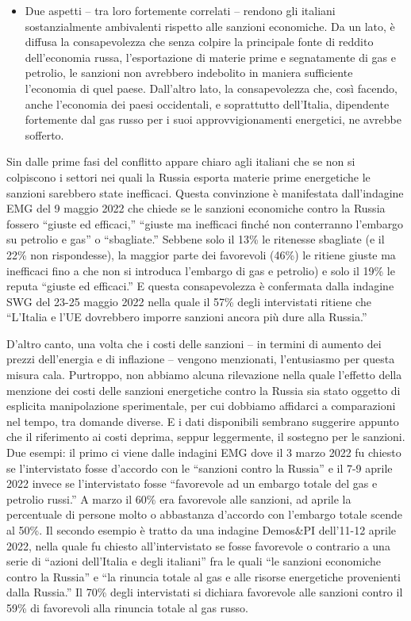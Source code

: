 \documentclass[
  openany]{book}
\providecommand{\tightlist}{%
  \setlength{\itemsep}{0pt}\setlength{\parskip}{0pt}}
\begin{document}
\begin{itemize}
\tightlist
\item
  Due aspetti -- tra loro fortemente correlati -- rendono gli italiani sostanzialmente ambivalenti rispetto alle sanzioni economiche. Da un lato, è diffusa la consapevolezza che senza colpire la principale fonte di reddito dell'economia russa, l'esportazione di materie prime e segnatamente di gas e petrolio, le sanzioni non avrebbero indebolito in maniera sufficiente l'economia di quel paese. Dall'altro lato, la consapevolezza che, così facendo, anche l'economia dei paesi occidentali, e soprattutto dell'Italia, dipendente fortemente dal gas russo per i suoi approvvigionamenti energetici, ne avrebbe sofferto.
\end{itemize}

Sin dalle prime fasi del conflitto appare chiaro agli italiani che se non si colpiscono i settori nei quali la Russia esporta materie prime energetiche le sanzioni sarebbero state inefficaci. Questa convinzione è manifestata dall'indagine EMG del 9 maggio 2022 che chiede se le sanzioni economiche contro la Russia fossero ``giuste ed efficaci,'' ``giuste ma inefficaci finché non conterranno l'embargo su petrolio e gas'' o ``sbagliate.'' Sebbene solo il 13\% le ritenesse sbagliate (e il 22\% non rispondesse), la maggior parte dei favorevoli (46\%) le ritiene giuste ma inefficaci fino a che non si introduca l'embargo di gas e petrolio) e solo il 19\% le reputa ``giuste ed efficaci.'' E questa consapevolezza è confermata dalla indagine SWG del 23-25 maggio 2022 nella quale il 57\% degli intervistati ritiene che ``L'Italia e l'UE dovrebbero imporre sanzioni ancora più dure alla Russia.''

D'altro canto, una volta che i costi delle sanzioni -- in termini di aumento dei prezzi dell'energia e di inflazione -- vengono menzionati, l'entusiasmo per questa misura cala. Purtroppo, non abbiamo alcuna rilevazione nella quale l'effetto della menzione dei costi delle sanzioni energetiche contro la Russia sia stato oggetto di esplicita manipolazione sperimentale, per cui dobbiamo affidarci a comparazioni nel tempo, tra domande diverse. E i dati disponibili sembrano suggerire appunto che il riferimento ai costi deprima, seppur leggermente, il sostegno per le sanzioni. Due esempi: il primo ci viene dalle indagini EMG dove il 3 marzo 2022 fu chiesto se l'intervistato fosse d'accordo con le ``sanzioni contro la Russia'' e il 7-9 aprile 2022 invece se l'intervistato fosse ``favorevole ad un embargo totale del gas e petrolio russi.'' A marzo il 60\% era favorevole alle sanzioni, ad aprile la percentuale di persone molto o abbastanza d'accordo con l'embargo totale scende al 50\%. Il secondo esempio è tratto da una indagine Demos\&PI dell'11-12 aprile 2022, nella quale fu chiesto all'intervistato se fosse favorevole o contrario a una serie di ``azioni dell'Italia e degli italiani'' fra le quali ``le sanzioni economiche contro la Russia'' e ``la rinuncia totale al gas e alle risorse energetiche provenienti dalla Russia.'' Il 70\% degli intervistati si dichiara favorevole alle sanzioni contro il 59\% di favorevoli alla rinuncia totale al gas russo.
\end{document}
